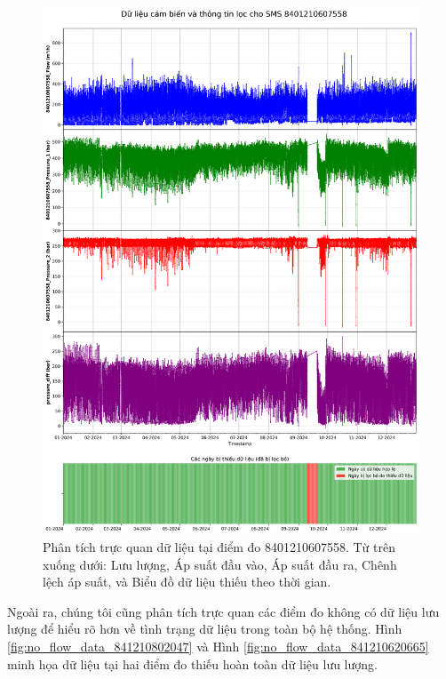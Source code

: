 \begin{figure}[htbp]
    \centering
    \includegraphics[width=\textwidth]{image/section6_1/timeseries_combined_8401210607558.png}
    \caption{Phân tích trực quan dữ liệu tại điểm đo 8401210607558. Từ trên xuống dưới: Lưu lượng, Áp suất đầu vào, Áp suất đầu ra, Chênh lệch áp suất, và Biểu đồ dữ liệu thiếu theo thời gian.}
    \label{fig:missing_data_visualization_8401210607558}
\end{figure}

Ngoài ra, chúng tôi cũng phân tích trực quan các điểm đo không có dữ liệu lưu lượng để hiểu rõ hơn về tình trạng dữ liệu trong toàn bộ hệ thống. Hình \ref{fig:no_flow_data_841210802047} và Hình \ref{fig:no_flow_data_841210620665} minh họa dữ liệu tại hai điểm đo thiếu hoàn toàn dữ liệu lưu lượng.

